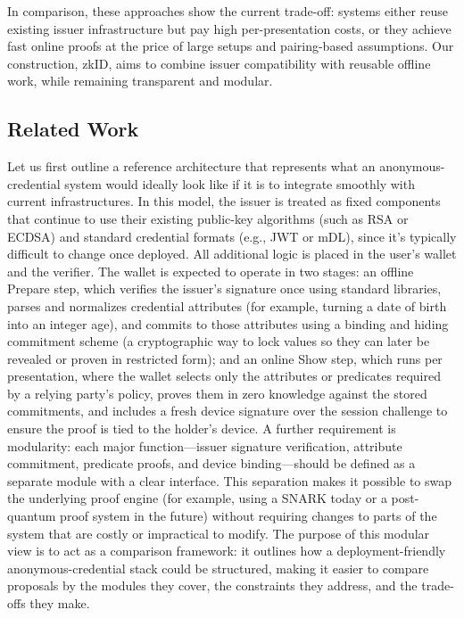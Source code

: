 In comparison, these approaches show the current trade-off: systems either reuse existing issuer infrastructure but pay high per-presentation costs, or they achieve fast online proofs at the price of large setups and pairing-based assumptions. Our construction, zkID, aims to combine issuer compatibility with reusable offline work, while remaining transparent and modular.

\subsection{Related Work}

Let us first outline a reference architecture that represents what an anonymous-credential system would ideally look like if it is to integrate smoothly with current infrastructures. In this model, the issuer is treated as fixed components that continue to use their existing public-key algorithms (such as RSA or ECDSA) and standard credential formats (e.g., JWT or mDL), since it's typically difficult to change once deployed. All additional logic is placed in the user’s wallet and the verifier.
The wallet is expected to operate in two stages: an offline Prepare step, which verifies the issuer’s signature once using standard libraries, parses and normalizes credential attributes (for example, turning a date of birth into an integer age), and commits to those attributes using a binding and hiding commitment scheme (a cryptographic way to lock values so they can later be revealed or proven in restricted form); and an online Show step, which runs per presentation, where the wallet selects only the attributes or predicates required by a relying party’s policy, proves them in zero knowledge against the stored commitments, and includes a fresh device signature over the session challenge to ensure the proof is tied to the holder’s device.
A further requirement is modularity: each major function---issuer signature verification, attribute commitment, predicate proofs, and device binding---should be defined as a separate module with a clear interface. This separation makes it possible to swap the underlying proof engine (for example, using a SNARK today or a post-quantum proof system in the future) without requiring changes to parts of the system that are costly or impractical to modify. The purpose of this modular view is to act as a comparison framework: it outlines how a deployment-friendly anonymous-credential stack could be structured, making it easier to compare proposals by the modules they cover, the constraints they address, and the trade-offs they make.

